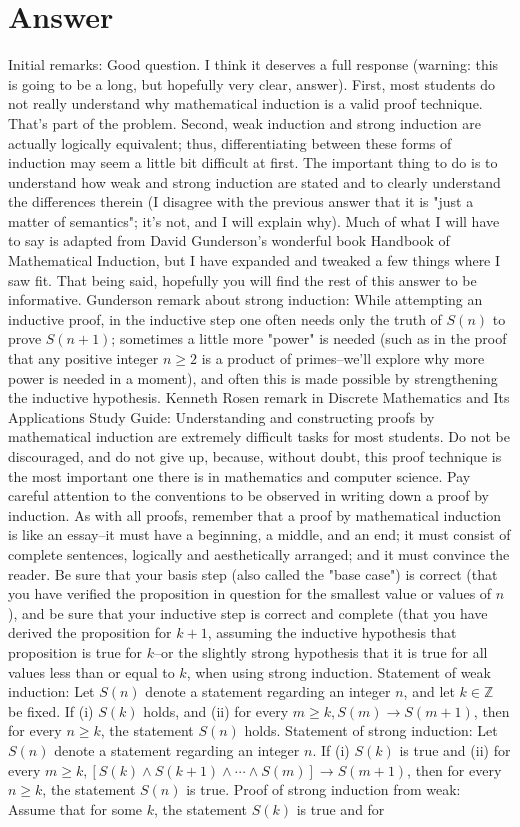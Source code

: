 \documentclass{article}
\begin{document}
\section*{Answer}
Initial remarks: Good question. I think it deserves a full response (warning: this is going to be a long, but hopefully very clear, answer). First, most students do not really understand why mathematical induction is a valid proof technique. That's part of the problem. Second, weak induction and strong induction are actually logically equivalent; thus, differentiating between these forms of induction may seem a little bit difficult at first. The important thing to do is to understand how weak and strong induction are stated and to clearly understand the differences therein (I disagree with the previous answer that it is "just a matter of semantics"; it's not, and I will explain why). Much of what I will have to say is adapted from David Gunderson's wonderful book Handbook of Mathematical Induction, but I have expanded and tweaked a few things where I saw fit. That being said, hopefully you will find the rest of this answer to be informative. Gunderson remark about strong induction: While attempting an inductive proof, in the inductive step one often needs only the truth of $S(n)$ to prove $S(n+1)$; sometimes a little more "power" is needed (such as in the proof that any positive integer $n\geq 2$ is a product of primes--we'll explore why more power is needed in a moment), and often this is made possible by strengthening the inductive hypothesis. Kenneth Rosen remark in Discrete Mathematics and Its Applications Study Guide: Understanding and constructing proofs by mathematical induction are extremely difficult tasks for most students. Do not be discouraged, and do not give up, because, without doubt, this proof technique is the most important one there is in mathematics and computer science. Pay careful attention to the conventions to be observed in writing down a proof by induction. As with all proofs, remember that a proof by mathematical induction is like an essay--it must have a beginning, a middle, and an end; it must consist of complete sentences, logically and aesthetically arranged; and it must convince the reader. Be sure that your basis step (also called the "base case") is correct (that you have verified the proposition in question for the smallest value or values of $n$), and be sure that your inductive step is correct and complete (that you have derived the proposition for $k+1$, assuming the inductive hypothesis that proposition is true for $k$--or the slightly strong hypothesis that it is true for all values less than or equal to $k$, when using strong induction. Statement of weak induction: Let $S(n)$ denote a statement regarding an integer $n$, and let $k\in\mathbb{Z}$ be fixed. If (i) $S(k)$ holds, and (ii) for every $m\geq k, S(m)\to S(m+1)$, then for every $n\geq k$, the statement $S(n)$ holds. Statement of strong induction: Let $S(n)$ denote a statement regarding an integer $n$. If (i) $S(k)$ is true and (ii) for every $m\geq k, [S(k)\land S(k+1)\land\cdots\land S(m)]\to S(m+1)$, then for every $n\geq k$, the statement $S(n)$ is true. Proof of strong induction from weak: Assume that for some $k$, the statement $S(k)$ is true and for 
\end{document}
